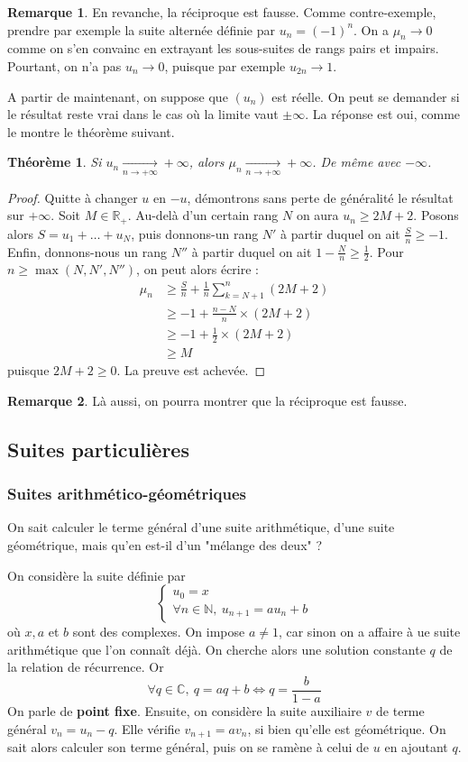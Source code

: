 \documentclass[french]{book}
\newcommand{\N}{\mathbb{N}}
\newcommand{\R}{\mathbb{R}}
\newcommand{\C}{\mathbb{C}}
\theoremstyle{plain}
\newtheorem{thm}{Théorème}[chapter]
\theoremstyle{definition}
\newtheorem{rmq}{Remarque}[chapter]
\theoremstyle{remark}
\begin{document}
\begin{rmq}
	En revanche, la réciproque est fausse. Comme contre-exemple, prendre par exemple la suite alternée définie par $u_n=(-1)^n$. On a $\mu_n\rightarrow0$ comme on s'en convainc en extrayant les sous-suites de rangs pairs et impairs. Pourtant, on n'a pas $u_n\rightarrow0$, puisque par exemple $u_{2n}\rightarrow1$.
\end{rmq}
A partir de maintenant, on suppose que $(u_n)$ est réelle. On peut se demander si le résultat reste vrai dans le cas où la limite vaut $\pm\infty$. La réponse est oui, comme le montre le théorème suivant.
\begin{thm}
	Si $u_n\xrightarrow[n\to+\infty]{}+\infty$, alors $\mu_n\xrightarrow[n\to+\infty]{}+\infty$. De même avec $-\infty$.
\end{thm}
\begin{proof}
	Quitte à changer $u$ en $-u$, démontrons sans perte de généralité le résultat sur $+\infty$. Soit $M\in\R_+$. Au-delà d'un certain rang $N$ on aura $u_n\geqslant2M+2$. Posons alors $S=u_1+\ldots+u_N$, puis donnons-un rang $N'$ à partir duquel on ait $\displaystyle\frac{S}{n}\geqslant-1$. Enfin, donnons-nous un rang $N''$ à partir duquel on ait $\displaystyle 1-\frac{N}{n}\geqslant\frac12$. Pour $n\geqslant\max(N,N',N'')$, on peut alors écrire :
	\begin{align*}
		\mu_n&\geqslant \frac{S}{n}+\frac1n\sum_{k=N+1}^{n}(2M+2)\\
		&\geqslant -1+\frac{n-N}{n}\times(2M+2) \\
		&\geqslant -1+\frac{1}{2}\times(2M+2)\\
		&\geqslant M
	\end{align*} puisque $2M+2\geqslant0$. La preuve est achevée.
\end{proof}
\begin{rmq}
	Là aussi, on pourra montrer que la réciproque est fausse.
\end{rmq}
\subsection{Suites particulières}
\subsubsection{Suites arithmético-géométriques}
On sait calculer le terme général d'une suite arithmétique, d'une suite géométrique, mais qu'en est-il d'un "mélange des deux" ? \\ \par On considère la suite définie par $$\left \{\begin{array}{ll}u_0=x\\ \forall n\in\N,\ u_{n+1}=au_n+b\end{array}\right.$$ où $x,a$ et $b$ sont des complexes. On impose $a\ne1$, car sinon on a affaire à ue suite arithmétique que l'on connaît déjà. On cherche alors une solution constante $q$ de la relation de récurrence. Or $$\forall q\in\C,\ q=aq+b\iff q=\frac{b}{1-a}$$ On parle de \textbf{point fixe}. Ensuite, on considère la suite auxiliaire $v$ de terme général $v_n=u_n-q$. Elle vérifie $v_{n+1}=av_n$, si bien qu'elle est géométrique. On sait alors calculer son terme général, puis on se ramène à celui de $u$ en ajoutant $q$.
\end{document}
